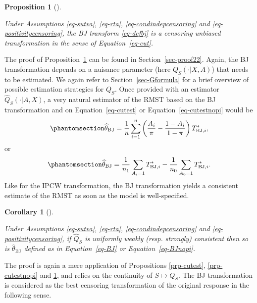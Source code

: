 \documentclass[
  11pt,
  a4paper,
]{article}
\theoremstyle{plain}
\theoremstyle{plain}
\newtheorem{corollary}{Corollary}[section]
\theoremstyle{plain}
\newtheorem{proposition}{Proposition}[section]
\theoremstyle{definition}
\theoremstyle{remark}
\begin{document}
\begin{proposition}[]\protect\hypertarget{prp-bj}{}\label{prp-bj}

Under Assumptions
\ref{eq-sutva}, \ref{eq-rta}, \ref{eq-condindepcensoring} and
\ref{eq-positivitycensoring}, the BJ transform \ref{eq-defbj} is a
censoring unbiased transformation in the sense of Equation~\ref{eq-cut}.

\end{proposition}

The proof of Proposition~\ref{prp-bj} can be found in
Section~\ref{sec-proof22}. Again, the BJ transformation depends on a
nuisance parameter (here \(Q_S(\cdot|X,A)\)) that needs to be estimated.
We again refer to Section~\ref{sec-Gformula} for a brief overview of
possible estimation strategies for \(Q_S\). Once provided with an
estimator \(\widehat Q_S(\cdot|A,X)\), a very natural estimator of the
RMST based on the BJ transformation and on Equation~\ref{eq-cutest} or
Equation~\ref{eq-cutestnopi} would be
\begin{equation}\phantomsection\label{eq-BJ}{
\widehat\theta_{\mathrm{BJ}} = \frac1n \sum_{i=1}^n \left(\frac{A_i}{\pi}-\frac{1-A_i}{1-\pi}\right) T^*_{\mathrm{BJ},i}, 
}\end{equation} or \begin{equation}\phantomsection\label{eq-BJnopi}{
\widehat\theta_{\mathrm{BJ}} = \frac1{n_1} \sum_{A_i=1}  T^*_{\mathrm{BJ},i}-\frac1{n_0} \sum_{A_0=1}  T^*_{\mathrm{BJ},i}. 
}\end{equation} Like for the IPCW transformation, the BJ transformation
yields a consistent estimate of the RMST as soon as the model is
well-specified.

\begin{corollary}[]\protect\hypertarget{cor-bjcons}{}\label{cor-bjcons}

Under Assumptions
\ref{eq-sutva}, \ref{eq-rta}, \ref{eq-condindepcensoring} and
\ref{eq-positivitycensoring}, if \(\widehat Q_S\) is uniformly weakly
(resp. strongly) consistent then so is \(\widehat\theta_{\mathrm{BJ}}\)
defined as in Equation~\ref{eq-BJ} or Equation~\ref{eq-BJnopi}.

\end{corollary}

The proof is again a mere application of Propositions
\ref{prp-cutest}, \ref{prp-cutestnopi} and \ref{prp-bj}, and relies on
the continuity of \(S \mapsto Q_S\). The BJ transformation is considered
as the best censoring transformation of the original response in the
following sense.
\end{document}
